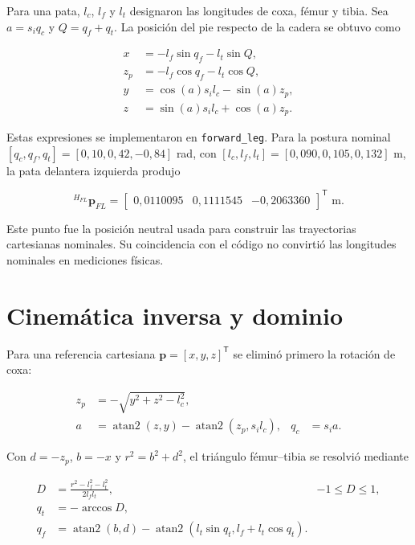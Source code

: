 Para una pata, $l_c$, $l_f$ y $l_t$ designaron las longitudes de coxa, fémur y
tibia. Sea $a=s_iq_c$ y $Q=q_f+q_t$. La posición del pie respecto de la cadera
se obtuvo como

\begin{align}
x &= -l_f\sin q_f-l_t\sin Q,\label{eq:nova-fkx}\\
z_p &= -l_f\cos q_f-l_t\cos Q,\label{eq:nova-fkzp}\\
y &= \cos(a)s_il_c-\sin(a)z_p,\label{eq:nova-fky}\\
z &= \sin(a)s_il_c+\cos(a)z_p.\label{eq:nova-fkz}
\end{align}

Estas expresiones se implementaron en \texttt{forward\_leg}. Para la postura
nominal $[q_c,q_f,q_t]=[0,10,0,42,-0,84]$ rad, con
$[l_c,l_f,l_t]=[0,090,0,105,0,132]$ m, la pata delantera izquierda produjo

\begin{equation}
{}^{H_{FL}}\mathbf p_{FL}=
\begin{bmatrix}0,0110095&0,1111545&-0,2063360\end{bmatrix}^{\mathsf T}\text{ m}.
\label{eq:nova-fk-example}
\end{equation}

Este punto fue la posición neutral usada para construir las trayectorias
cartesianas nominales. Su coincidencia con el código no convirtió las
longitudes nominales en mediciones físicas.

\section{Cinemática inversa y dominio}

Para una referencia cartesiana $\mathbf p=[x,y,z]^{\mathsf T}$ se eliminó
primero la rotación de coxa:

\begin{align}
z_p&=-\sqrt{y^2+z^2-l_c^2},\label{eq:nova-ikzp}\\
a&=\operatorname{atan2}(z,y)-\operatorname{atan2}(z_p,s_il_c),
&q_c&=s_ia.\label{eq:nova-ikcoxa}
\end{align}

Con $d=-z_p$, $b=-x$ y $r^2=b^2+d^2$, el triángulo fémur--tibia se resolvió
mediante

\begin{align}
D&=\frac{r^2-l_f^2-l_t^2}{2l_fl_t},&-1\leq D\leq1,\\
q_t&=-\arccos D,\label{eq:nova-knee}\\
q_f&=\operatorname{atan2}(b,d)-
\operatorname{atan2}\left(l_t\sin q_t,l_f+l_t\cos q_t\right).
\label{eq:nova-ikfemur}
\end{align}

